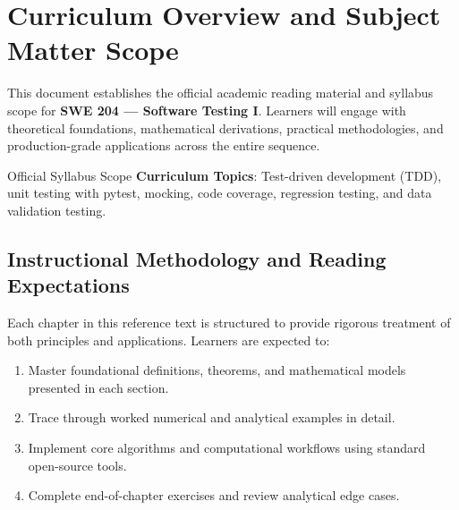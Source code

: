 \section{Curriculum Overview and Subject Matter Scope}

This document establishes the official academic reading material and syllabus scope for \textbf{SWE 204 --- Software Testing I}. Learners will engage with theoretical foundations, mathematical derivations, practical methodologies, and production-grade applications across the entire sequence.

\begin{InsightBox}{Official Syllabus Scope}
  \textbf{Curriculum Topics}: Test-driven development (TDD), unit testing with pytest, mocking, code coverage, regression testing, and data validation testing.
\end{InsightBox}

\subsection{Instructional Methodology and Reading Expectations}

Each chapter in this reference text is structured to provide rigorous treatment of both principles and applications. Learners are expected to:
\begin{enumerate}
  \item Master foundational definitions, theorems, and mathematical models presented in each section.
  \item Trace through worked numerical and analytical examples in detail.
  \item Implement core algorithms and computational workflows using standard open-source tools.
  \item Complete end-of-chapter exercises and review analytical edge cases.
\end{enumerate}

